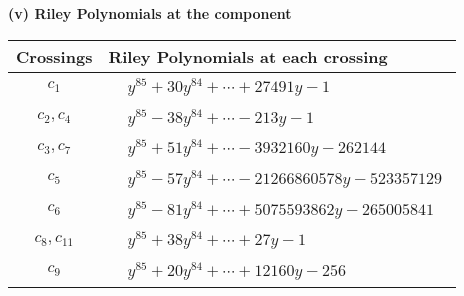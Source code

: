\documentclass[1p]{elsarticle_modified}
\theoremstyle{definition}
\begin{document}
\newpage\renewcommand{\arraystretch}{1}
\flushleft \textbf{(v) Riley Polynomials at the component}\newline \\
\begin{tabular}{m{50pt}|m{274pt}}
Crossings & \hspace{64pt}Riley Polynomials at each crossing \\
\hline $$\begin{aligned}c_{1}\end{aligned}$$&$\begin{aligned}
&y^{85}+30 y^{84}+\cdots+27491 y-1
\end{aligned}$\\
\hline $$\begin{aligned}c_{2},c_{4}\end{aligned}$$&$\begin{aligned}
&y^{85}-38 y^{84}+\cdots-213 y-1
\end{aligned}$\\
\hline $$\begin{aligned}c_{3},c_{7}\end{aligned}$$&$\begin{aligned}
&y^{85}+51 y^{84}+\cdots-3932160 y-262144
\end{aligned}$\\
\hline $$\begin{aligned}c_{5}\end{aligned}$$&$\begin{aligned}
&y^{85}-57 y^{84}+\cdots-21266860578 y-523357129
\end{aligned}$\\
\hline $$\begin{aligned}c_{6}\end{aligned}$$&$\begin{aligned}
&y^{85}-81 y^{84}+\cdots+5075593862 y-265005841
\end{aligned}$\\
\hline $$\begin{aligned}c_{8},c_{11}\end{aligned}$$&$\begin{aligned}
&y^{85}+38 y^{84}+\cdots+27 y-1
\end{aligned}$\\
\hline $$\begin{aligned}c_{9}\end{aligned}$$&$\begin{aligned}
&y^{85}+20 y^{84}+\cdots+12160 y-256
\end{aligned}$\\

\end{tabular}
\end{document}

